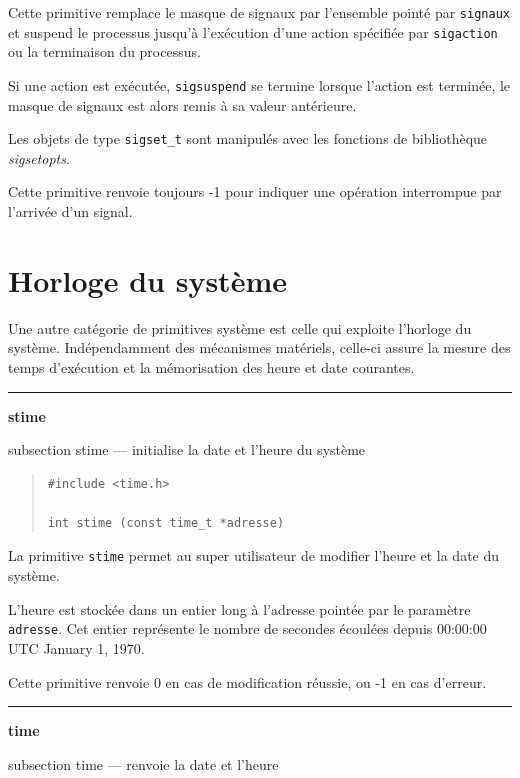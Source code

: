 \documentclass [twoside] {report}
\newcommand {\primitive} [1]
    {
	\phantomsection
	{\large \textbf {#1}}
	\addcontentsline {toc} {subsection} {#1}
    }
\newcommand {\separation}
    {
	\vspace {5mm}
	\nopagebreak
	\hrule
    }
\begin{document}
Cette primitive remplace le masque de signaux par l'ensemble pointé par
\texttt {signaux} et suspend le processus jusqu'à l'exécution d'une action
spécifiée par \texttt {sigaction} ou la terminaison du processus.

Si une action est exécutée, \texttt {sigsuspend} se termine lorsque l'action
est terminée, le masque de signaux est alors remis à sa valeur
antérieure.

Les objets de type \texttt {sigset\_t} sont manipulés avec les fonctions de
bibliothèque \emph {sigsetopts}.

Cette primitive renvoie toujours -1 pour indiquer une opération
interrompue par l'arrivée d'un signal.



\section {Horloge du système}


Une autre catégorie de primitives système est
celle qui exploite l'horloge du système.
Indépendamment des mécanismes matériels, celle-ci
assure la mesure des temps d'exé\-cu\-tion et la
mémorisation des heure et date courantes.



\separation
\primitive {stime} --- initialise la date et l'heure du système

\begin {quote}
\begin {verbatim}
#include <time.h>

int stime (const time_t *adresse)
\end{verbatim}
\end {quote}

La primitive \texttt {stime} permet au super
utilisateur de modifier l'heure et la date du
système.

L'heure est stockée dans un entier long à
l'adresse pointée par le paramètre \texttt {adresse}. Cet
entier représente le nombre de secondes écoulées
depuis 00:00:00 UTC January 1, 1970.

Cette primitive renvoie 0 en cas de modification
réussie, ou -1 en cas d'erreur.




\separation
\primitive {time} --- renvoie la date et l'heure
    \label {time}
\end{document}
